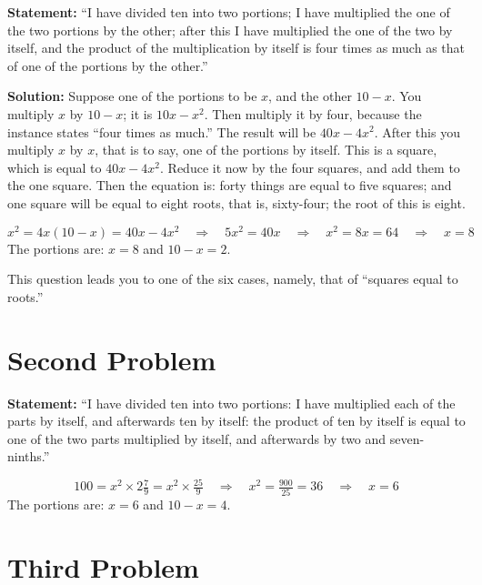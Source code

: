 \documentclass[11pt,a4paper]{book}
\begin{document}
\textbf{Statement:} ``I have divided ten into two portions; I have multiplied
the one of the two portions by the other; after this I have multiplied the
one of the two by itself, and the product of the multiplication by itself is
four times as much as that of one of the portions by the other.''

\textbf{Solution:} Suppose one of the portions to be $x$, and the other $10 - x$.
You multiply $x$ by $10 - x$; it is $10x - x^2$. Then multiply it by four,
because the instance states ``four times as much.'' The result will be $40x -
4x^2$. After this you multiply $x$ by $x$, that is to say, one of the
portions by itself. This is a square, which is equal to $40x - 4x^2$.
Reduce it now by the four squares, and add them to the one square. Then the
equation is: forty things are equal to five squares; and one square will be
equal to eight roots, that is, sixty-four; the root of this is eight.

\begin{mathbox}
\begin{equation}
x^2 = 4x(10-x) = 40x - 4x^2 \quad\Rightarrow\quad 5x^2 = 40x \quad\Rightarrow\quad x^2 = 8x = 64 \quad\Rightarrow\quad x = 8
\end{equation}
The portions are: $x = 8$ and $10 - x = 2$.
\end{mathbox}

This question leads you to one of the six cases, namely, that of ``squares
equal to roots.''

\section*{Second Problem}

\textbf{Statement:} ``I have divided ten into two portions: I have multiplied
each of the parts by itself, and afterwards ten by itself: the product of ten
by itself is equal to one of the two parts multiplied by itself, and
afterwards by two and seven-ninths.''

\begin{mathbox}
\begin{equation}
100 = x^2 \times 2\tfrac{7}{9} = x^2 \times \tfrac{25}{9} \quad\Rightarrow\quad
x^2 = \tfrac{900}{25} = 36 \quad\Rightarrow\quad x = 6
\end{equation}
The portions are: $x = 6$ and $10 - x = 4$.
\end{mathbox}

\section*{Third Problem}
\end{document}
